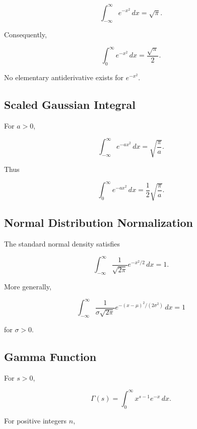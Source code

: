 \[
\boxed{
\int_{-\infty}^{\infty}
e^{-x^2}
\,dx
=
\sqrt{\pi}.
}
\]

Consequently,

\[
\boxed{
\int_0^\infty
e^{-x^2}
\,dx
=
\frac{
\sqrt{\pi}
}{
2
}.
}
\]

No elementary antiderivative exists for \(e^{-x^2}\).

\subsection{Scaled Gaussian Integral}
\label{subsec:scaled-gaussian-integral}

For \(a>0\),

\[
\boxed{
\int_{-\infty}^{\infty}
e^{-ax^2}
\,dx
=
\sqrt{
\frac{\pi}{a}
}.
}
\]

Thus

\[
\boxed{
\int_0^\infty
e^{-ax^2}
\,dx
=
\frac12
\sqrt{
\frac{\pi}{a}
}.
}
\]

\subsection{Normal Distribution Normalization}
\label{subsec:normal-distribution-integral}

The standard normal density satisfies

\[
\boxed{
\int_{-\infty}^{\infty}
\frac{
1
}{
\sqrt{2\pi}
}
e^{-x^2/2}
\,dx
=
1.
}
\]

More generally,

\[
\boxed{
\int_{-\infty}^{\infty}
\frac{
1
}{
\sigma\sqrt{2\pi}
}
e^{-(x-\mu)^2/(2\sigma^2)}
\,dx
=
1
}
\]

for \(\sigma>0\).

\subsection{Gamma Function}
\label{subsec:gamma-function-integral-reference}

For \(s>0\),

\[
\boxed{
\Gamma(s)
=
\int_0^\infty
x^{s-1}e^{-x}
\,dx.
}
\]

For positive integers \(n\),

